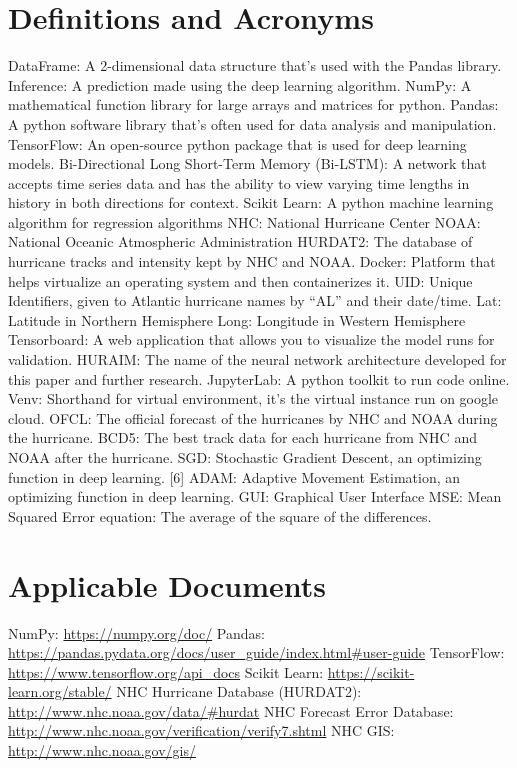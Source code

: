 \documentclass{article}
\begin{document}
\section{Definitions and Acronyms}
DataFrame: A 2-dimensional data structure that’s used with the Pandas library.
Inference: A prediction made using the deep learning algorithm.
NumPy: A mathematical function library for large arrays and matrices for python.
Pandas: A python software library that’s often used for data analysis and manipulation.
TensorFlow: An open-source python package that is used for deep learning models.
Bi-Directional Long Short-Term Memory (Bi-LSTM): A network that accepts time series data and has the ability to view varying time lengths in history in both directions for context.
Scikit Learn: A python machine learning algorithm for regression algorithms
NHC: National Hurricane Center
NOAA: National Oceanic Atmospheric Administration
HURDAT2: The database of hurricane tracks and intensity kept by NHC and NOAA.
Docker: Platform that helps virtualize an operating system and then containerizes it.
UID: Unique Identifiers, given to Atlantic hurricane names by “AL” and their date/time.
Lat: Latitude in Northern Hemisphere
Long: Longitude in Western Hemisphere
Tensorboard: A web application that allows you to visualize the model runs for validation. 
HURAIM: The name of the neural network architecture developed for this paper and further research.
JupyterLab: A python toolkit to run code online.
Venv: Shorthand for virtual environment, it’s the virtual instance run on google cloud.
OFCL: The official forecast of the hurricanes by NHC and NOAA during the hurricane.
BCD5: The best track data for each hurricane from NHC and NOAA after the hurricane.
SGD: Stochastic Gradient Descent, an optimizing function in deep learning. [6]
ADAM: Adaptive Movement Estimation, an optimizing function in deep learning.
GUI: Graphical User Interface
MSE: Mean Squared Error equation: The average of the square of the differences.

\section{Applicable Documents}
NumPy: \url{https://numpy.org/doc/}
Pandas: \url{https://pandas.pydata.org/docs/user_guide/index.html#user-guide}
TensorFlow: \url{https://www.tensorflow.org/api_docs}
Scikit Learn: \url{https://scikit-learn.org/stable/}
NHC Hurricane Database (HURDAT2): \url{http://www.nhc.noaa.gov/data/#hurdat}
NHC Forecast Error Database: \url{http://www.nhc.noaa.gov/verification/verify7.shtml}
NHC GIS: \url{http://www.nhc.noaa.gov/gis/}
\end{document}
